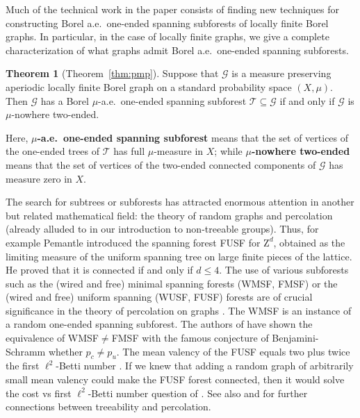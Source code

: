 \documentclass[11pt]{amsart}
\theoremstyle{definition}
\newtheorem{thmintro}{Theorem}
\theoremstyle{plain}
\newcommand{\<}{\langle}
\renewcommand{\>}{\rangle}
\newcommand{\Z}{\bm{\mathrm{Z}}}
\newcommand{\Ggraph}{\mathcal{G}}
\newcommand{\Tgraph}{\mathcal{T}}
\newcommand{\define}[1]{\textbf{#1}}
\newcommand{\pmp}{\text{p.m.p.}}
\begin{document}
Much of the technical work in the paper consists of finding new techniques for constructing Borel a.e.\ one-ended spanning subforests of locally finite Borel graphs.
In particular, in the case of locally finite \pmp{} graphs, we give a
complete characterization of what graphs admit Borel a.e.\ one-ended
spanning subforests.
\begin{thmintro}[Theorem~\ref{thm:pmp}]
\label{th: pmp: 1-ended subforest iff now 2-ended - intro}
  Suppose that ${\Ggraph}$ is a measure preserving aperiodic locally finite
  Borel graph on a standard probability space $(X,\mu)$. Then ${\Ggraph}$ has a Borel
  $\mu$-a.e.\ one-ended spanning subforest $\Tgraph\subseteq \Ggraph$ if and only if ${\Ggraph}$ is $\mu$-nowhere
  two-ended.
\end{thmintro}

Here, \define{$\mu$-a.e.\ one-ended spanning subforest} means that the set of vertices of the one-ended trees of $\Tgraph$ has full $\mu$-measure in $X$;
while \define{$\mu$-nowhere two-ended} means that the set of vertices of the two-ended connected components of $\Ggraph$ has measure zero in $X$.

The search for subtrees or subforests has attracted enormous attention in another but related mathematical field: the theory of random graphs and percolation (already alluded to in our introduction to non-treeable groups).
Thus, for example Pemantle \cite{Pemantle-1991-WSF} introduced the spanning forest FUSF for $\Z^d$, obtained as the
 limiting measure of the uniform spanning tree on large finite pieces of the lattice. He proved that it is connected if and only if $d\leq 4$. The use of various subforests such as the (wired and free) minimal spanning forests (WMSF, FMSF) or the (wired and free) uniform spanning (WUSF, FUSF) forests are of crucial significance in the theory of percolation on graphs \cite{BLPS01,LPS06}.
The WMSF is an instance of a random one-ended spanning subforest.
The authors of \cite{LPS06} have shown the equivalence of WMSF$\not=$FMSF with the famous conjecture of Benjamini-Schramm \cite{Benjamini-Schramm-96} whether $p_c\not=p_u$. The mean valency of the FUSF equals two plus twice the first $\ell^2$-Betti number \cite[Corollary 4.12]{Lyons-2009-random-complexes}.
If we knew that adding a random graph of arbitrarily small mean valency could make the FUSF forest connected, then it would solve the cost vs first $\ell^2$-Betti number question of  \cite[p. 129]{Gab02}. See also \cite{GL} and \cite{Ti19} for further connections between treeability and percolation.
\end{document}
